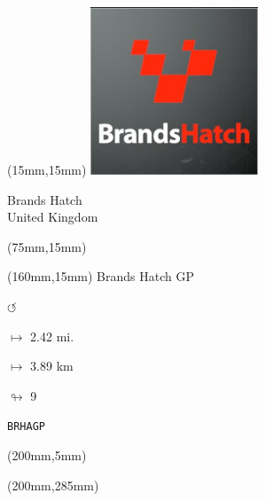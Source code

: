 \begin{textblock*}{50mm}(15mm,15mm)%
\includegraphics[width=50mm]{LG/2015-05-20_00074.png}
\par Brands Hatch\\ United Kingdom
\end{textblock*}
\begin{textblock*}{80mm}(75mm,15mm)%
\end{textblock*}
\begin{textblock*}{40mm}(160mm,15mm)%
Brands Hatch GP
\par \Huge$\circlearrowleft$
\Large
\par$\mapsto$ 2.42 mi.
\par$\mapsto$ 3.89 km
\par$\looparrowright$ 9
\par\hfill\tiny\tt BRHAGP\\
\end{textblock*}
\begin{textblock*}{20mm}(200mm,5mm)%
\fbox{\thepage}
\end{textblock*}
\begin{textblock*}{20mm}(200mm,285mm)%
\fbox{\thepage}
\end{textblock*}
